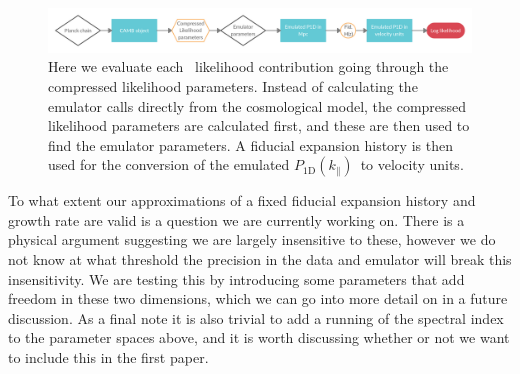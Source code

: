 \documentclass[preprintnumbers,prd,superscriptaddress,notitlepage,nofootinbib] {revtex4-1}
\newcommand{\fluxpower}{$P_\mathrm{1D}(k_\parallel)$}
\begin{document}
\begin{figure}[ht]
    \begin{center}
     \includegraphics[scale=0.2]{Figures/Compressed_test.png}
    \end{center}
    \caption{Here we evaluate each \lyaf\ likelihood contribution going
    through the compressed likelihood parameters. Instead of calculating
    the emulator calls directly from the cosmological model, the compressed
    likelihood parameters are calculated first, and these are then used to
    find the emulator parameters. A fiducial expansion history is then used for
    the conversion of the emulated \fluxpower\ to velocity units.}
    \label{fig:param_test}
\end{figure}

To what extent our approximations of a fixed fiducial expansion history and
growth rate are valid is a question we are currently working on. There is a physical
argument suggesting we are largely insensitive to these, however we do not know
at what threshold the precision in the data and emulator will break this insensitivity.
We are testing this by introducing some parameters that add freedom in these two
dimensions, which we can go into more detail on in a future discussion.
As a final note it is also trivial to add a running of the spectral index
to the parameter spaces above, and it is worth discussing whether or not we
want to include this in the first paper.



\end{document}
